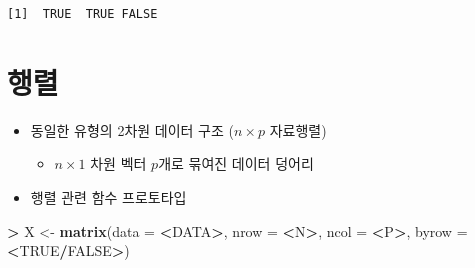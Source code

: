 \documentclass[11pt,a4paper]{book}
\newenvironment{Shaded}{\begin{snugshade}}{\end{snugshade}}
\newcommand{\KeywordTok}[1]{\textcolor[rgb]{0.13,0.29,0.53}{\textbf{#1}}}
\newcommand{\DataTypeTok}[1]{\textcolor[rgb]{0.13,0.29,0.53}{#1}}
\newcommand{\StringTok}[1]{\textcolor[rgb]{0.31,0.60,0.02}{#1}}
\newcommand{\OtherTok}[1]{\textcolor[rgb]{0.56,0.35,0.01}{#1}}
\newcommand{\OperatorTok}[1]{\textcolor[rgb]{0.81,0.36,0.00}{\textbf{#1}}}
\newcommand{\NormalTok}[1]{#1}
\providecommand{\tightlist}{%
  \setlength{\itemsep}{0pt}\setlength{\parskip}{0pt}}
\theoremstyle{definition}
\theoremstyle{definition}
\theoremstyle{definition}
\theoremstyle{remark}
\begin{document}
\begin{Shaded}
\end{Shaded}

\begin{verbatim}
[1]  TRUE  TRUE FALSE
\end{verbatim}

\normalsize

\section{행렬}

\begin{itemize}
\tightlist
\item
  동일한 유형의 2차원 데이터 구조 (\(n \times p\) 자료행렬)

  \begin{itemize}
  \tightlist
  \item
    \(n \times 1\) 차원 벡터 \(p\)개로 묶여진 데이터 덩어리
  \end{itemize}
\item
  행렬 관련 함수 프로토타입
\end{itemize}

\footnotesize

\begin{Shaded}
\begin{Highlighting}[]
\OperatorTok{>}\StringTok{ }\NormalTok{X <-}\StringTok{ }\KeywordTok{matrix}\NormalTok{(}\DataTypeTok{data =} \OperatorTok{<}\NormalTok{DATA}\OperatorTok{>}\NormalTok{, }\DataTypeTok{nrow =} \OperatorTok{<}\NormalTok{N}\OperatorTok{>}\NormalTok{, }\DataTypeTok{ncol =} \OperatorTok{<}\NormalTok{P}\OperatorTok{>}\NormalTok{, }\DataTypeTok{byrow =} \OperatorTok{<}\OtherTok{TRUE}\OperatorTok{/}\OtherTok{FALSE}\OperatorTok{>}\NormalTok{)}
\end{Highlighting}
\end{Shaded}

\normalsize
\end{document}
